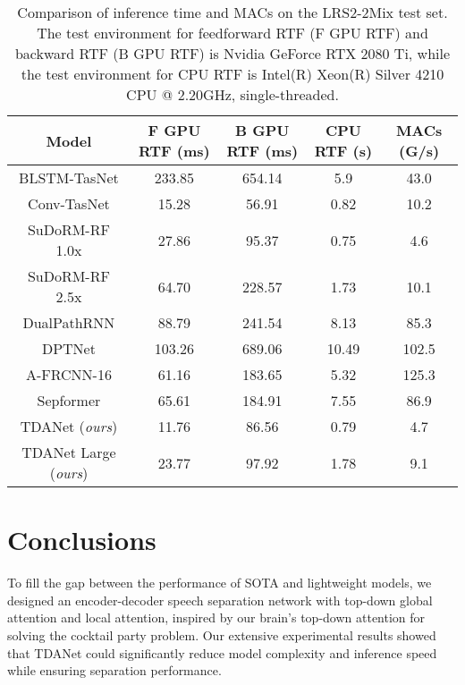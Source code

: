 \documentclass{article} \usepackage{iclr2023_conference,times}
\begin{document}
\begin{table}[ht]
\vspace{-1.0em}
\caption{Comparison of inference time and MACs on the LRS2-2Mix test set. The test environment for feedforward RTF (F GPU RTF) and backward RTF (B GPU RTF) is Nvidia GeForce RTX 2080 Ti, while the test environment for CPU RTF is Intel(R) Xeon(R) Silver 4210 CPU @ 2.20GHz, single-threaded.}
\label{table:eff}
\footnotesize
\centering
\begin{tabular}{ccccc}
\toprule
Model             & F GPU RTF   (ms) & B GPU RTF   (ms) & CPU RTF (s) & MACs (G/s) \\
\midrule
BLSTM-TasNet      & 233.85           & 654.14           & 5.9      & 43.0   \\
Conv-TasNet       & 15.28            & 56.91            & 0.82   & 10.2     \\
SuDoRM-RF  1.0x   & 27.86            & 95.37            & 0.75    & 4.6    \\
SuDoRM-RF  2.5x   & 64.70            & 228.57           & 1.73    & 10.1    \\
DualPathRNN       & 88.79            & 241.54           & 8.13    & 85.3    \\
DPTNet            &  103.26           &   689.06         &  10.49   & 102.5     \\
A-FRCNN-16        & 61.16            & 183.65           & 5.32    & 125.3    \\
Sepformer         & 65.61            & 184.91           & 7.55    & 86.9    \\
\midrule
TDANet (\textit{ours})  & 11.76            & 86.56            & 0.79  & 4.7      \\
TDANet Large (\textit{ours}) & 23.77            & 97.92            & 1.78    & 9.1    \\
\bottomrule
\end{tabular}
\vspace{-1.5em}
\end{table}

\section{Conclusions}
To fill the gap between the performance of SOTA and lightweight models, we designed an encoder-decoder speech separation network with top-down global attention and local attention, inspired by our brain's top-down attention for solving the cocktail party problem. Our extensive experimental results showed that TDANet could significantly reduce model complexity and inference speed while ensuring separation performance. 
\end{document}
